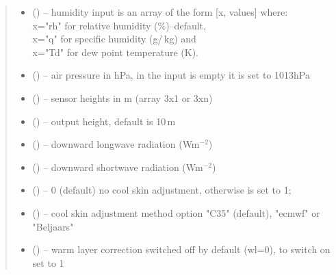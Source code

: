 \documentclass[letterpaper,10pt,english]{sphinxmanual}
\begin{document}
\begin{fulllineitems}
\begin{quote}
\begin{description}
\begin{itemize}
\item {} 
 (\href{https://docs.python.org/3/library/functions.html\#float}{}) -- humidity input is an array of the form [x, values] where: \\
x="rh" for relative humidity (\%)--default, \\
x="q" for specific humidity (g\slash\,kg) and \\
x="Td" for dew point temperature (K).

\item {} 
 (\href{https://docs.python.org/3/library/functions.html\#float}{}) -- air pressure in hPa, in the input is empty it is set to 1013hPa

\item {} 
 (\href{https://docs.python.org/3/library/functions.html\#float}{}) -- sensor heights in m (array 3x1 or 3xn)

\item {} 
 (\href{https://docs.python.org/3/library/functions.html\#float}{}) -- output height, default is 10\,m

\item {} 
 (\href{https://docs.python.org/3/library/functions.html\#float}{}) -- downward longwave radiation (Wm$^{-2}$)

\item {} 
 (\href{https://docs.python.org/3/library/functions.html\#float}{}) -- downward shortwave radiation (Wm$^{-2}$)

\item {} 
 (\href{https://docs.python.org/3/library/functions.html\#int}{}) -- 0 (default) no cool skin adjustment, otherwise is set to 1; 

\item {} 
 (\href{https://docs.python.org/3/library/functions.html\#str}{}) -- cool skin adjustment method option "C35" (default), "ecmwf" or "Beljaars"

\item {} 
 (\href{https://docs.python.org/3/library/functions.html\#int}{}) -- warm layer correction switched off by default (wl=0), to switch on set to 1


\end{itemize}
\end{description}
\end{quote}
\end{fulllineitems}
\end{document}

